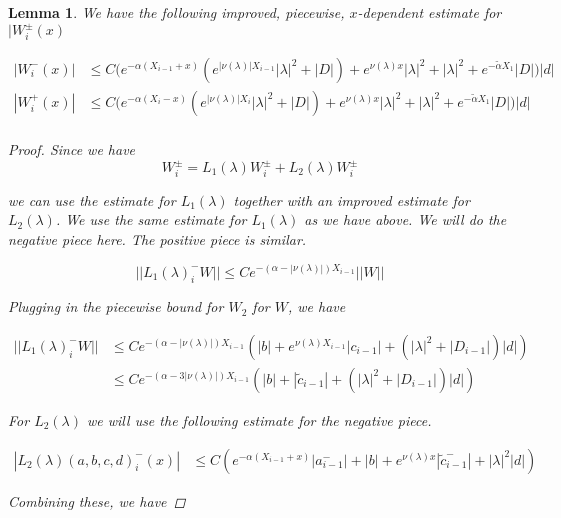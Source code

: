 \documentclass[12pt]{article}
\newtheorem{lemma}{Lemma}
\begin{document}
\begin{lemma}
We have the following improved, piecewise, $x$-dependent estimate for $|W_i^\pm(x)$

\begin{align*}
| W_i^-(x)| &\leq C \Big(e^{-\alpha(X_{i-1} + x)}( e^{|\nu(\lambda)| X_{i-1}} |\lambda|^2 + |D|) + e^{\nu(\lambda)x} |\lambda|^2 
+ |\lambda|^2 + e^{-\tilde{\alpha} X_1} |D| \Big) |d| \\
| W_i^+(x)| &\leq C \Big(e^{-\alpha(X_i - x)}( e^{|\nu(\lambda)| X_i} |\lambda|^2 + |D|) + e^{\nu(\lambda)x} |\lambda|^2 
+ |\lambda|^2 + e^{-\tilde{\alpha} X_1} |D| \Big) |d| \\
\end{align*}

\begin{proof}

Since we have 
\[
W_i^\pm = L_1(\lambda)W_i^\pm + L_2(\lambda)W_i^\pm 
\]

we can use the estimate for $L_1(\lambda)$ together with an improved estimate for $L_2(\lambda)$. We use the same estimate for $L_1(\lambda)$ as we have above. We will do the negative piece here. The positive piece is similar.

\[
||L_1(\lambda)_i^- W|| \leq C e^{-(\alpha -|\nu(\lambda)|)X_{i-1}} ||W||
\]

Plugging in the piecewise bound for $W_2$ for $W$, we have

\begin{align*}
||L_1(\lambda)_i^- W|| &\leq C e^{-(\alpha -|\nu(\lambda)|)X_{i-1}} ( |b| + e^{\nu(\lambda)X_{i-1}}|c_{i-1}| + (|\lambda|^2 + |D_{i-1}|)|d| ) \\
&\leq C e^{-(\alpha - 3|\nu(\lambda)|)X_{i-1}} ( |b| + |\tilde{c}_{i-1}| + (|\lambda|^2 + |D_{i-1}|)|d| ) 
\end{align*}

For $L_2(\lambda)$ we will use the following estimate for the negative piece.

\begin{align*}
|L_2(\lambda)(a,b,c,d)_i^-(x)| &\leq C (e^{-\alpha(X_{i-1} + x)}|a_{i-1}^-| + |b| + e^{\nu(\lambda)x} |\tilde{c}_{i-1}^-| + |\lambda|^2 |d| )
\end{align*}

Combining these, we have


\end{proof}
\end{lemma}
\end{document}
